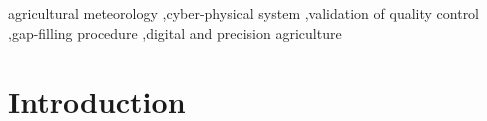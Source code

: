 \documentclass[authoryear,preprint,review,12pt]{elsarticle}
\begin{document}
\begin{frontmatter}
\begin{keyword}
agricultural meteorology \sep cyber-physical system \sep validation of quality control \sep gap-filling procedure \sep digital and precision agriculture

\end{keyword}


\end{frontmatter}


\linenumbers



\section{Introduction}
\end{document}
